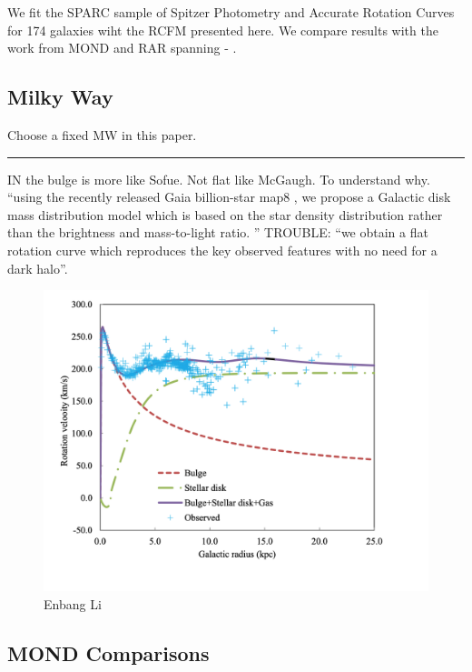 \documentclass[reprint,%
 amsmath,amssymb,
 aps,
]{revtex4-1}
\begin{document}
 We fit the SPARC sample of Spitzer Photometry and Accurate Rotation Curves for 174 galaxies  \cite{2016Lelli} wiht the RCFM presented here. 
We compare results with the work from MOND and RAR spanning  \citet{McGaugh_2014}- \citet{Li_2018}. 
  
 
\subsection{Milky Way}
{\color{red}Choose a fixed MW in this paper. }

{\color{red} \rule{\linewidth}{0.5mm}}



IN \cite{Li2016ModellingMD} the bulge is more like Sofue. Not flat like McGaugh. 
To understand why. 
``using the recently released Gaia billion-star map8
, we propose a
Galactic disk mass distribution model which is based on the star density distribution
rather than the brightness and mass-to-light ratio. ''
TROUBLE: ``we obtain a flat rotation curve
which reproduces the key observed features with no need for a dark halo''.

\begin{figure}
    \centering
    \includegraphics{MW_Enbang_Li}
    \caption{Enbang Li \cite{Li2016ModellingMD}}
    \label{fig:my_label}
\end{figure}

\subsection{MOND Comparisons}
\end{document}
